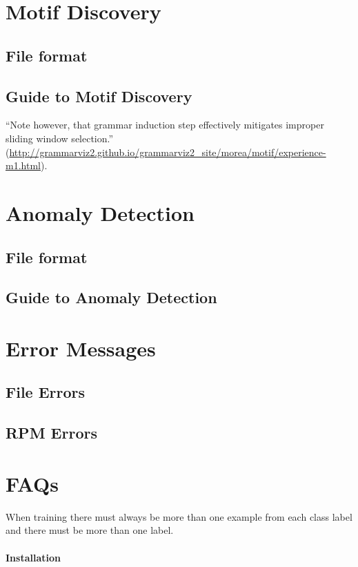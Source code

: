 \documentclass[letterpaper, 12pt]{article}
\begin{document}
\section{Motif Discovery}
\subsection{File format}
\subsection{Guide to Motif Discovery}


``Note however, that grammar induction step effectively mitigates improper sliding window selection.'' (\url{http://grammarviz2.github.io/grammarviz2_site/morea/motif/experience-m1.html}).

\section{Anomaly Detection}
\subsection{File format}
\subsection{Guide to Anomaly Detection}

\section{Error Messages}
\subsection{File Errors}
\subsection{RPM Errors}

\section{FAQs}

When training there must always be more than one example from each class label and there must be more than one label.

\paragraph{Installation}
\end{document}
